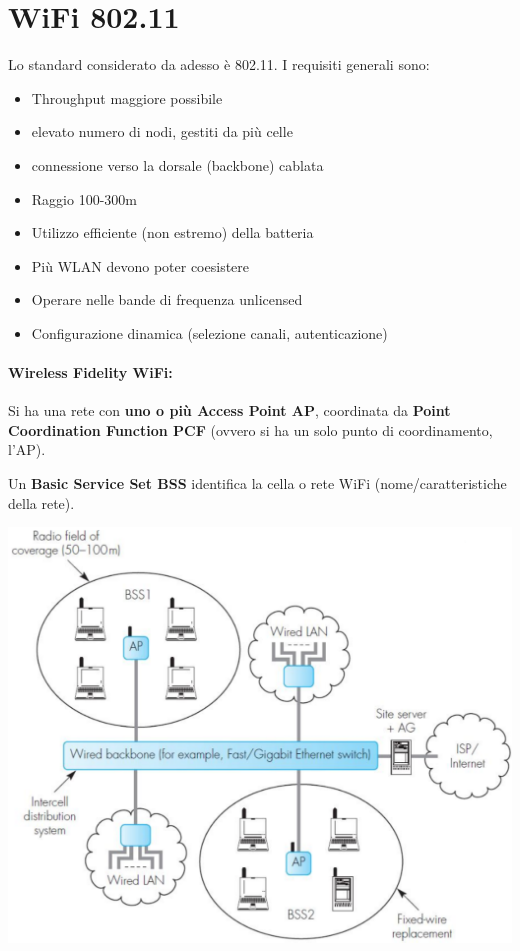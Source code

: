 \section{WiFi 802.11}

Lo standard considerato da adesso è 802.11. I requisiti generali sono: 
\begin{itemize}
	\item Throughput maggiore possibile

	\item elevato numero di nodi, gestiti da più celle

	\item connessione verso la dorsale (backbone) cablata

	\item Raggio 100-300m

	\item Utilizzo efficiente (non estremo) della batteria

	\item Più WLAN devono poter coesistere

	\item Operare nelle bande di frequenza unlicensed

	\item Configurazione dinamica (selezione canali, autenticazione)
\end{itemize}

\paragraph{Wireless Fidelity WiFi:} Si ha una rete con \textbf{uno o più Access Point AP}, coordinata da \textbf{Point Coordination Function PCF} (ovvero si ha un solo punto di coordinamento, l'AP). 

Un \textbf{Basic Service Set BSS} identifica la cella o rete WiFi (nome/caratteristiche della rete).
\begin{center}
	\includegraphics[width=0.7\linewidth]{img/wlan/wifistruct1}
\end{center}

